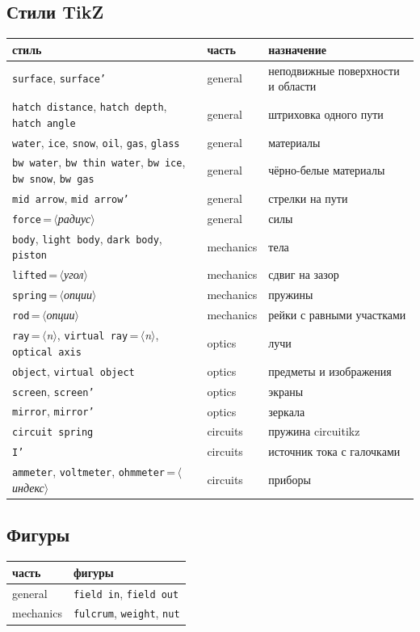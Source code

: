 \documentclass[a4paper,11pt]{article}
\newcommand\pkg[1]{\textsf{#1}}
\newcommand\key[1]{\texttt{#1}}
\newcommand\meta[1]{\ensuremath{\langle}\textit{#1}\ensuremath{\rangle}}
\begin{document}
\subsection{Стили TikZ}
\begin{center}\small
\begin{tabular}{lll}
  \toprule
  стиль & часть & назначение \\
  \midrule
  \key{surface}, \key{surface'} & general & неподвижные поверхности и области \\
  \key{hatch distance}, \key{hatch depth}, \key{hatch angle} & general & штриховка одного пути \\
  \key{water}, \key{ice}, \key{snow}, \key{oil}, \key{gas}, \key{glass} & general & материалы \\
  \key{bw water}, \key{bw thin water}, \key{bw ice}, \key{bw snow}, \key{bw gas} & general & чёрно-белые материалы \\
  \key{mid arrow}, \key{mid arrow'} & general & стрелки на пути \\
  \key{force}\,=\,\meta{радиус} & general & силы \\
  \key{body}, \key{light body}, \key{dark body}, \key{piston} & mechanics & тела \\
  \key{lifted}\,=\,\meta{угол} & mechanics & сдвиг на зазор \\
  \key{spring}\,=\,\meta{опции} & mechanics & пружины \\
  \key{rod}\,=\,\meta{опции} & mechanics & рейки с равными участками \\
  \key{ray}\,=\,\meta{n}, \key{virtual ray}\,=\,\meta{n}, \key{optical axis} & optics & лучи \\
  \key{object}, \key{virtual object} & optics & предметы и изображения \\
  \key{screen}, \key{screen'} & optics & экраны \\
  \key{mirror}, \key{mirror'} & optics & зеркала \\
  \key{circuit spring} & circuits & пружина \pkg{circuitikz} \\
  \key{I'} & circuits & источник тока с галочками \\
  \key{ammeter}, \key{voltmeter}, \key{ohmmeter}\,=\,\meta{индекс} & circuits & приборы \\
  \bottomrule
\end{tabular}
\end{center}

\subsection{Фигуры}
\begin{center}\small
\begin{tabular}{ll}
  \toprule
  часть & фигуры \\
  \midrule
  general & \texttt{field in}, \texttt{field out} \\
  mechanics & \texttt{fulcrum}, \texttt{weight}, \texttt{nut} \\
  \bottomrule
\end{tabular}
\end{center}
\end{document}
